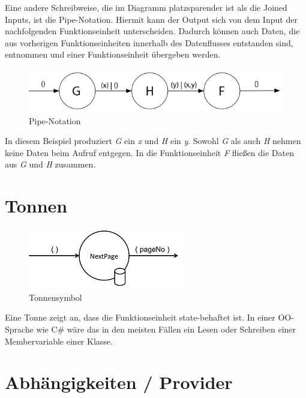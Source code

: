 \bigskip
Eine andere Schreibweise, die im Diagramm platzsparender ist als die Joined Inputs, ist die Pipe-Notation.
Hiermit kann der Output sich von dem Input der nachfolgenden Funktionseinheit unterscheiden.
Dadurch können auch Daten, die aus vorherigen Funktionseinheiten innerhalb des Datenflusses entstanden sind, entnommen und einer Funktionseinheit
übergeben werden.

\begin{figure}[!htbp]
	\centering
	\includegraphics[width=\linewidth]{./img/diagramPipe.jpg}
	\caption{Pipe-Notation}
\end{figure}

In diesem Beispiel produziert \textit{G} ein \textit{x} und \textit{H} ein \textit{y}. Sowohl \textit{G} als auch \textit{H} nehmen keine Daten beim Aufruf entgegen.
In die Funktionseinheit \textit{F} fließen die Daten aus \textit{G} und \textit{H} zusammen.

\section{Tonnen}

\begin{figure}[!htbp]
	\centering
		\includegraphics[width=.7\linewidth]{./img/diagramTonne.png}
	\caption{Tonnensymbol}
\end{figure}



Eine Tonne zeigt an, dass die Funktionseinheit state-behaftet ist.
In einer OO-Sprache wie C\# wäre das in den meisten Fällen ein Lesen oder
Schreiben einer Membervariable einer Klasse.

\section{Abhängigkeiten / Provider}

